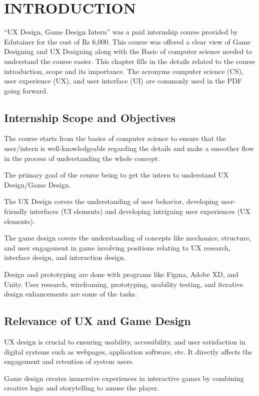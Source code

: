 \documentclass[12pt,a4paper]{report}
\begin{document}
\chapter{INTRODUCTION}

``UX Design, Game Design Intern'' was a paid internship course provided by Edutainer for the cost of Rs 6,000. This course was offered a clear view of Game Designing and UX Designing along with the Basic of computer science needed to understand the course easier. This chapter fills in the details related to the course introduction, scope and its importance. The acronyms computer science (CS), user experience (UX), and user interface (UI) are commonly used in the PDF going forward.

\section{Internship Scope and Objectives}
The course starts from the basics of computer science to ensure that the user/intern is well-knowledgeable regarding the details and make a smoother flow in the process of understanding the whole concept.

The primary goal of the course being to get the intern to understand UX Design/Game Design.

The UX Design covers the understanding of user behavior, developing user-friendly interfaces (UI elements) and developing intriguing user experiences (UX elements).

The game design covers the understanding of concepts like mechanics, structure, and user engagement in game involving positions relating to UX research, interface design, and interaction design.

Design and prototyping are done with programs like Figma, Adobe XD, and Unity. User research, wireframing, prototyping, usability testing, and iterative design enhancements are some of the tasks.

\section{Relevance of UX and Game Design}
UX design is crucial to ensuring usability, accessibility, and user satisfaction in digital systems such as webpages, application software, etc. It directly affects the engagement and retention of system users.

Game design creates immersive experiences in interactive games by combining creative logic and storytelling to amuse the player.
\end{document}
